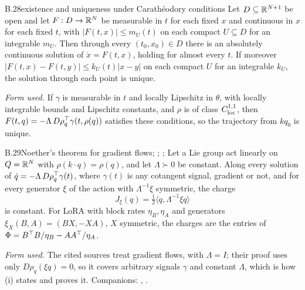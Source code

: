 \begin{auxresult}{B.28}{existence and uniqueness under Carathéodory conditions}{\citep[Ch.~I, Thms~5.1 and
5.3]{xhale1980ordinary}}
Let $D\subseteq\mathbb{R}^{N+1}$ be open and let $F:D\to\mathbb{R}^N$ be measurable in $t$ for each fixed $x$ and continuous in $x$ for
each fixed $t$, with $\lvert F(t,x)\rvert\le m_U(t)$ on each compact $U\subseteq D$ for an integrable $m_U$. Then through
every $(t_0,x_0)\in D$ there is an absolutely continuous solution of $\dot x=F(t,x)$, holding for almost every $t$. If
moreover $\lvert F(t,x)-F(t,y)\rvert\le k_U(t)\lvert x-y\rvert$ on each compact $U$ for an integrable $k_U$, the solution
through each point is unique.
\end{auxresult}
\noindent\emph{Form used.} If $\gamma$ is measurable in $t$ and locally Lipschitz in $\theta$, with locally integrable
bounds and Lipschitz constants, and $\rho$ is of class $C^{1,1}_{\rm loc}$, then $F(t,q)=-\Lambda\,D\rho_q^{\top}\gamma(t,\rho(q))$
satisfies these conditions, so the trajectory from $kq_0$ is unique.

\begin{auxresult}{B.29}{Noether's theorem for gradient flows}{\citep{kunin2020neural}; \citep[Prop.~5.1]{zhao2022symmetries};
\citep{marcotte2023abide}; \citep{du2018algorithmic}}
Let a Lie group act linearly on $Q=\mathbb{R}^N$ with $\rho(k\cdot q)=\rho(q)$, and let $\Lambda\succ0$ be constant. Along every
solution of $\dot q=-\Lambda\,D\rho_q^{\top}\gamma(t)$, where $\gamma(t)$ is any cotangent signal, gradient or not, and for every
generator $\xi$ of the action with $\Lambda^{-1}\xi$ symmetric, the charge
\begin{equation*}
  J_\xi(q)=\tfrac12\langle q,\Lambda^{-1}\xi q\rangle
\end{equation*}
is constant. For LoRA with block rates $\eta_B,\eta_A$ and generators $\xi_X(B,A)=(BX,-XA)$, $X$ symmetric, the charges
are the entries of $\Phi=B^{\top} B/\eta_B-AA^{\top}/\eta_A$.
\end{auxresult}
\noindent\emph{Form used.} The cited sources treat gradient flows, \citet{zhao2022symmetries} with $\Lambda=I$; their
proof uses only $D\rho_q(\xi q)=0$, so it covers arbitrary signals $\gamma$ and constant $\Lambda$, which is how
(i) states and proves it. Companions: , .

